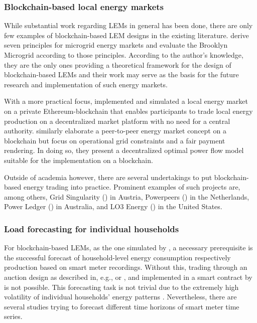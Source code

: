 \subsubsection{Blockchain-based local energy markets}

While substantial work regarding LEMs in general has been done, there are only few examples of blockchain-based LEM designs in the existing literature. \citet{Mengelkamp:2018b} derive seven principles for microgrid energy markets and evaluate the Brooklyn Microgrid according to those principles. According to the author's knowledge, they are the only ones providing a theoretical framework for the design of blockchain-based LEMs and their work may serve as the basis for the future research and implementation of such energy markets.

With a more practical focus, \citet{Mengelkamp:2018a} implemented and simulated a local energy market on a private Ethereum-blockchain that enables participants to trade local energy production on a decentralized market platform with no need for a central authority. \citet{Münsing:2017} similarly elaborate a peer-to-peer energy market concept on a blockchain but focus on operational grid constraints and a fair payment rendering. In doing so, they present a decentralized optimal power flow model suitable for the implementation on a blockchain.

Outside of academia however, there are several undertakings to put blockchain-based energy trading into practice. Prominent examples of such projects are, among others, Grid Singularity () in Austria, Powerpeers () in the Netherlands, Power Ledger () in Australia, and LO3 Energy () in the United States.



\newpage
\subsubsection{Load forecasting for individual households}


For blockchain-based LEMs, as the one simulated by \citet{Mengelkamp:2018a}, a necessary prerequisite is the successful forecast of household-level energy consumption respectively production based on smart meter recordings. Without this, trading through an auction design as described in, e.g., \citet{Block:2008} or \citet{Buchmann:2013}, and implemented in a smart contract by \citet{Mengelkamp:2018a} is not possible. This forecasting task is not trivial due to the extremely high volatility of individual households' energy patterns \citep{Wang:2018}. Nevertheless, there are several studies trying to forecast different time horizons of smart meter time series.

